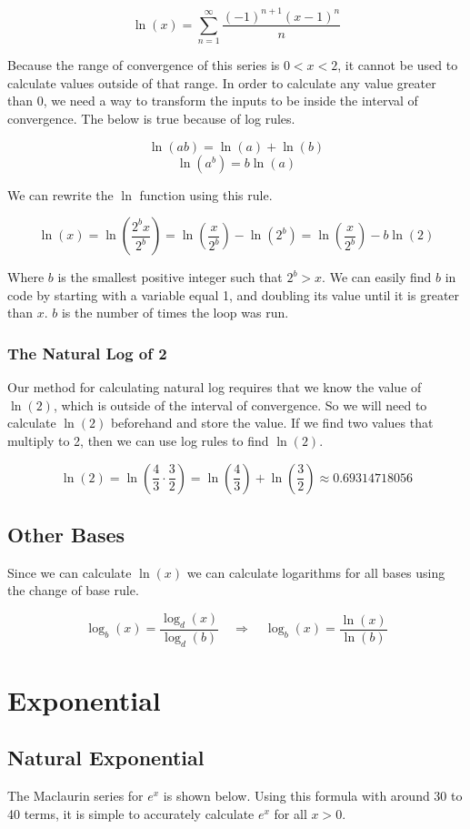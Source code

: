 \documentclass[12pt, letterpaper]{article}
\begin{document}
\[ \ln(x) = \sum_{n=1}^{\infty}\frac{\left(-1\right)^{n+1}\left(x-1\right)^{n}}{n} \]

Because the range of convergence of this series is $0<x<2$, it cannot be used to calculate values outside of that range. In order to calculate any value greater than 0, we need a way to transform the inputs to be inside the interval of convergence. The below is true because of log rules.

\[ \ln(ab) = \ln(a) + \ln(b) \]
\[ \ln(a^b) = b\ln(a) \]

We can rewrite the $\ln$ function using this rule.

\[ \ln(x) = \ln\left(\frac{2^bx}{2^b}\right) = \ln\left(\frac{x}{2^b}\right) - \ln\left(2^b\right) = \ln\left(\frac{x}{2^b}\right) - b\ln\left(2\right) \]

Where $b$ is the smallest positive integer such that $2^b>x$. We can easily find $b$ in code by starting with a variable equal 1, and doubling its value until it is greater than $x$. $b$ is the number of times the loop was run.

\subsubsection{The Natural Log of 2}
Our method for calculating natural log requires that we know the value of $\ln(2)$, which is outside of the interval of convergence. So we will need to calculate $\ln(2)$ beforehand and store the value. If we find two values that multiply to 2, then we can use log rules to find $\ln(2)$.

\[ \ln(2) = \ln\left(\frac{4}{3} \cdot \frac{3}{2}\right) = \ln\left(\frac{4}{3}\right) + \ln\left(\frac{3}{2}\right) \approx 0.69314718056 \]

\subsection{Other Bases}
Since we can calculate $\ln(x)$ we can calculate logarithms for all bases using the change of base rule.

\[ \log_b(x) = \frac{\log_d(x)}{\log_d(b)} \quad \Rightarrow \quad \log_b(x) = \frac{\ln(x)}{\ln(b)} \]

\section{Exponential}
\subsection{Natural Exponential}
The Maclaurin series for $e^x$ is shown below. Using this formula with around 30 to 40 terms, it is simple to accurately calculate $e^x$ for all $x>0$.
\end{document}
